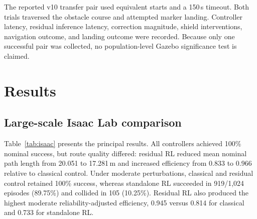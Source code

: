 \documentclass[10pt,twocolumn]{article}
\begin{document}
The reported v10 transfer pair used equivalent starts and a 150\,s timeout. Both trials traversed the obstacle course and attempted marker landing. Controller latency, residual inference latency, correction magnitude, shield interventions, navigation outcome, and landing outcome were recorded. Because only one successful pair was collected, no population-level Gazebo significance test is claimed.

\section{Results}

\subsection{Large-scale Isaac Lab comparison}
Table~\ref{tab:isaac} presents the principal results. All controllers achieved 100\% nominal success, but route quality differed: residual RL reduced mean nominal path length from 20.051 to 17.281\,m and increased efficiency from 0.833 to 0.966 relative to classical control. Under moderate perturbations, classical and residual control retained 100\% success, whereas standalone RL succeeded in 919/1,024 episodes (89.75\%) and collided in 105 (10.25\%). Residual RL also produced the highest moderate reliability-adjusted efficiency, 0.945 versus 0.814 for classical and 0.733 for standalone RL.
\end{document}
